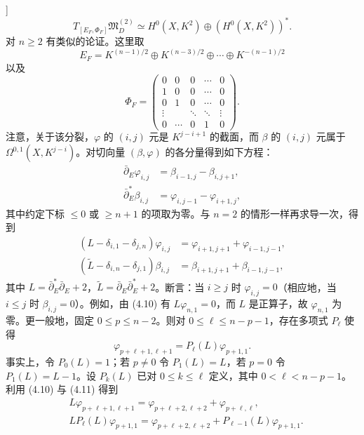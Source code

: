 \begin{example}[参看 [35, 38]]
\[
T_{[E_F,\Phi_F]}\mathfrak{M}_D^{(2)}\simeq H^0(X,K^2)\oplus(H^0(X,K^2))^*.
\]
对 $n\ge2$ 有类似的论证。这里取
\[
E_F=K^{(n-1)/2}\oplus K^{(n-3)/2}\oplus\cdots\oplus K^{-(n-1)/2}
\]
以及
\[
\Phi_F=\begin{pmatrix}
0&0&0&\cdots&0\\
1&0&0&\cdots&0\\
0&1&0&\cdots&0\\
\vdots& &\ddots&\ddots&\vdots\\
0&\cdots&0&1&0
\end{pmatrix}.
\]
注意，关于该分裂，$\varphi$ 的 $(i,j)$ 元是 $K^{j-i+1}$ 的截面，而 $\beta$ 的 $(i,j)$ 元属于 $\Omega^{0,1}(X,K^{j-i})$。对切向量 $(\beta,\varphi)$ 的各分量得到如下方程：
\begin{equation}
\begin{aligned}
\bar\partial_E\varphi_{i,j}&=\beta_{i-1,j}-\beta_{i,j+1},\\
\bar\partial^*_E\beta_{i,j}&=\varphi_{i,j-1}-\varphi_{i+1,j},
\end{aligned}
\label{eq:4.9}\tag{4.9}
\end{equation}
其中约定下标 $\le0$ 或 $\ge n+1$ 的项取为零。与 $n=2$ 的情形一样再求导一次，得到
\begin{equation}
\begin{aligned}
(L-\delta_{i,1}-\delta_{j,n})\varphi_{i,j}&=\varphi_{i+1,j+1}+\varphi_{i-1,j-1},\\
(\widetilde{L}-\delta_{i,n}-\delta_{j,1})\beta_{i,j}&=\beta_{i+1,j+1}+\beta_{i-1,j-1},
\end{aligned}
\label{eq:4.10}\tag{4.10}
\end{equation}
其中 $L=\bar\partial^*_E\bar\partial_E+2$，$\widetilde{L}=\bar\partial_E\bar\partial^*_E+2$。断言：当 $i\ge j$ 时 $\varphi_{i,j}=0$（相应地，当 $i\le j$ 时 $\beta_{i,j}=0$）。例如，由 (4.10) 有 $L\varphi_{n,1}=0$，而 $L$ 是正算子，故 $\varphi_{n,1}$ 为零。更一般地，固定 $0\le p\le n-2$。则对 $0\le\ell\le n-p-1$，存在多项式 $P_\ell$ 使得
\begin{equation}
\varphi_{p+\ell+1,\ell+1}=P_\ell(L)\varphi_{p+1,1}.
\label{eq:4.11}\tag{4.11}
\end{equation}
事实上，令 $P_0(L)=1$；若 $p\ne0$ 令 $P_1(L)=L$，若 $p=0$ 令 $P_1(L)=L-1$。设 $P_k(L)$ 已对 $0\le k\le\ell$ 定义，其中 $0<\ell<n-p-1$。利用 (4.10) 与 (4.11) 得到
\[
\begin{aligned}
&L\varphi_{p+\ell+1,\ell+1}=\varphi_{p+\ell+2,\ell+2}+\varphi_{p+\ell,\ell},\\
&LP_\ell(L)\varphi_{p+1,1}=\varphi_{p+\ell+2,\ell+2}+P_{\ell-1}(L)\varphi_{p+1,1}.

\end{aligned}\]
\end{example}
